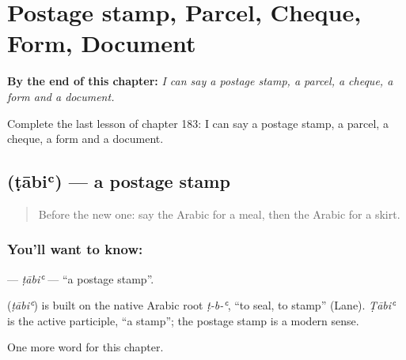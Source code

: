 
\chapter{Postage stamp, Parcel, Cheque, Form, Document}
\label{ch:ar-postage-stamp-parcel-cheque-form-document}

\begin{chapteropening}
\textbf{By the end of this chapter:} \emph{I can say a postage stamp, a parcel, a cheque, a form and a document.}

Complete the last lesson of chapter 183: I can say a postage stamp, a parcel, a cheque, a form and a document.
\end{chapteropening}

\section[\texorpdfstring{\ar{طابع} (ṭābiʿ)}{طابع (ṭābiʿ)}]{ (ṭābiʿ) — a postage stamp}

\label{lesson:AR-C183-tabi}



\begin{quote}
Before the new one: say the Arabic for a meal, then the Arabic for a skirt.
\end{quote}

\subsection*{You'll want to know: }
\textbf{} — \emph{ṭābiʿ} — \textquotedblleft{}a postage stamp\textquotedblright{}.

\begin{cousinweb}
\textbf{} (\emph{ṭābiʿ}) is built on the native Arabic root \emph{ṭ-b-ʿ}, \textquotedblleft{}to seal, to stamp\textquotedblright{} (Lane). \emph{Ṭābiʿ} is the active participle, \textquotedblleft{}a stamp\textquotedblright{}; the postage stamp is a modern sense.
\end{cousinweb}

\begin{grammarlens}[title={What you've built}]
One more word for this chapter.
\end{grammarlens}

